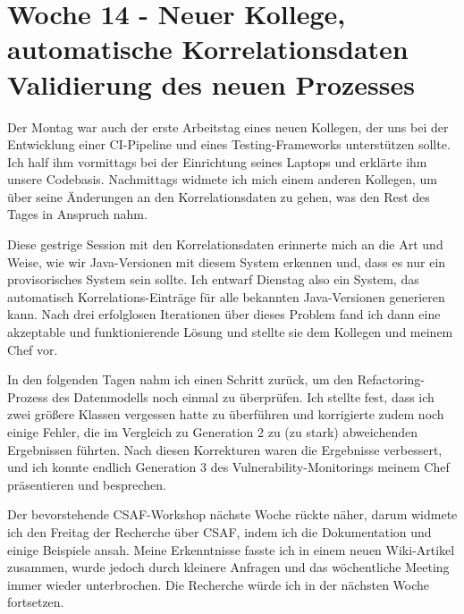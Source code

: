 \section{Woche 14 - Neuer Kollege, automatische Korrelationsdaten \headerand Validierung des neuen Prozesses} \label{sec:bericht-wo-14}


\lweekdaymarginpar{\weekdayMondayLong}

Der Montag war auch der erste Arbeitstag eines neuen Kollegen, der uns bei der Entwicklung einer CI-Pipeline und eines Testing-Frameworks unterstützen sollte.
Ich half ihm vormittags bei der Einrichtung seines Laptops und erklärte ihm unsere Codebasis.
Nachmittags widmete ich mich einem anderen Kollegen, um über seine Änderungen an den Korrelationsdaten zu gehen, was den Rest des Tages in Anspruch nahm.

\sweekdaymarginpar{\weekdayTuesdayLong}

Diese gestrige Session mit den Korrelationsdaten erinnerte mich an die Art und Weise, wie wir Java-Versionen mit diesem System erkennen und, dass es nur ein provisorisches System sein sollte.
Ich entwarf Dienstag also ein System, das automatisch Korrelations-Einträge für alle bekannten Java-Versionen generieren kann.
Nach drei erfolglosen Iterationen über dieses Problem fand ich dann eine akzeptable und funktionierende Lösung und stellte sie dem Kollegen und meinem Chef vor.


\sweekdaymarginpar{\weekdayWednesdayShort, \weekdayThursdayShort}

In den folgenden Tagen nahm ich einen Schritt zurück, um den Refactoring-Prozess des Datenmodells noch einmal zu überprüfen.
Ich stellte fest, dass ich zwei größere Klassen vergessen hatte zu überführen und korrigierte zudem noch einige Fehler, die im Vergleich zu Generation 2 zu (zu stark) abweichenden Ergebnissen führten.
Nach diesen Korrekturen waren die Ergebnisse verbessert, und ich konnte endlich Generation 3 des Vulnerability-Monitorings meinem Chef präsentieren und besprechen.

\sweekdaymarginpar{\weekdayFridayLong}

Der bevorstehende CSAF-Workshop nächste Woche rückte näher, darum widmete ich den Freitag der Recherche über CSAF, indem ich die Dokumentation und einige Beispiele ansah.
Meine Erkenntnisse fasste ich in einem neuen Wiki-Artikel zusammen, wurde jedoch durch kleinere Anfragen und das wöchentliche Meeting immer wieder unterbrochen.
Die Recherche würde ich in der nächsten Woche fortsetzen.
